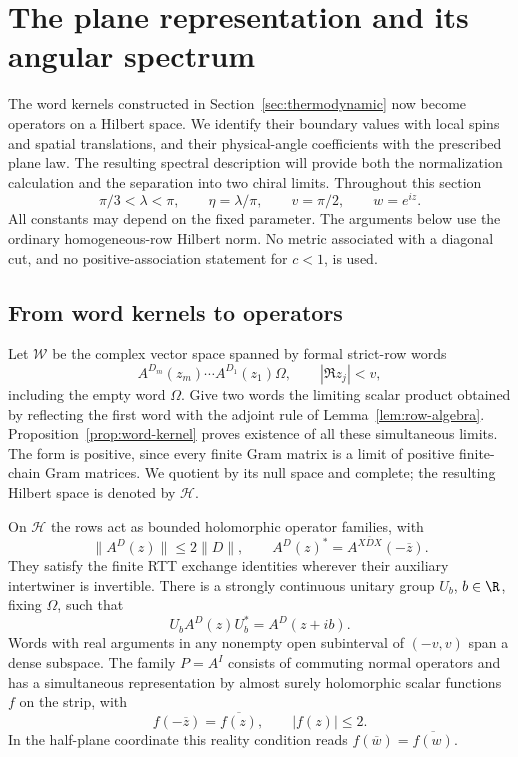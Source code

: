 \section{The plane representation and its angular spectrum}\label{sec:angular}

The word kernels constructed in Section~\ref{sec:thermodynamic} now become
operators on a Hilbert space.  We identify their boundary values with local
spins and spatial translations, and their physical-angle coefficients with
the prescribed plane law.  The resulting spectral description will provide
both the normalization calculation and the separation into two chiral
limits.  Throughout this section
\[
 \pi/3<\lambda<\pi,\qquad \eta=\lambda/\pi,\qquad v=\pi/2,
 \qquad w=e^{iz}.
\]
All constants may depend on the fixed parameter.  The arguments below use
the ordinary homogeneous-row Hilbert norm.  No metric associated with a
diagonal cut, and no positive-association statement for $c<1$, is used.

\subsection{From word kernels to operators}

Let $\mathcal W$ be the complex vector space spanned by formal strict-row
words
\[
 A^{D_m}(z_m)\cdots A^{D_1}(z_1)\Omega,
 \qquad |\Re z_j|<v,
\]
including the empty word $\Omega$.  Give two words the limiting scalar
product obtained by reflecting the first word with the adjoint rule of
Lemma~\ref{lem:row-algebra}.  Proposition~\ref{prop:word-kernel} proves
existence of all these simultaneous limits.  The form is positive, since
every finite Gram matrix is a limit of positive finite-chain Gram matrices.
We quotient by its null space and complete; the resulting Hilbert space is
denoted by $\mathcal H$.

\begin{proposition}\label{prop:angular-space}
On $\mathcal H$ the rows act as bounded holomorphic operator families, with
\[
 \|A^D(z)\|\le 2\|D\|,\qquad
 A^D(z)^*=A^{X\overline D X}(-\overline z).
\]
They satisfy the finite RTT exchange identities wherever their auxiliary
intertwiner is invertible.  There is a strongly continuous unitary group
$U_b$, $b\in\R$, fixing $\Omega$, such that
\begin{equation}\label{eq:angular-covariance}
 U_bA^D(z)U_b^*=A^D(z+ib).
\end{equation}
Words with real arguments in any nonempty open subinterval of $(-v,v)$
span a dense subspace.  The family $P=A^I$ consists of commuting normal
operators and has a simultaneous representation by almost surely
holomorphic scalar functions $f$ on the strip, with
\begin{equation}\label{eq:angular-scalar-star}
 f(-\overline z)=\overline{f(z)},\qquad |f(z)|\le2.
\end{equation}
In the half-plane coordinate this reality condition reads
$f(\overline w)=\overline{f(w)}$.
\end{proposition}

